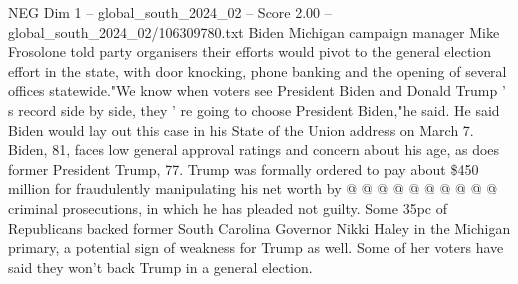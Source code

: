 \begin{textsample}{NEG Dim 1 – global\_south\_2024\_02 – Score 2.00 – global\_south\_2024\_02/106309780.txt}
Biden Michigan campaign manager Mike Frosolone told party organisers their efforts would pivot to the general election effort in the state, with door knocking, phone banking and the opening of several offices statewide."We know when voters see President Biden and Donald Trump ' s record side by side, they ' re going to choose President Biden,"he said.
He said Biden would lay out this case in his State of the Union address on March 7.
Biden, 81, faces low general approval ratings and concern about his age, as does former President Trump, 77.
Trump was formally ordered to pay about \$450 million for fraudulently manipulating his net worth by @ @ @ @ @ @ @ @ @ @ criminal prosecutions, in which he has pleaded not guilty.
Some 35pc of Republicans backed former South Carolina Governor Nikki Haley in the Michigan primary, a potential sign of weakness for Trump as well.
Some of her voters have said they won't back Trump in a general election.

\end{textsample}
